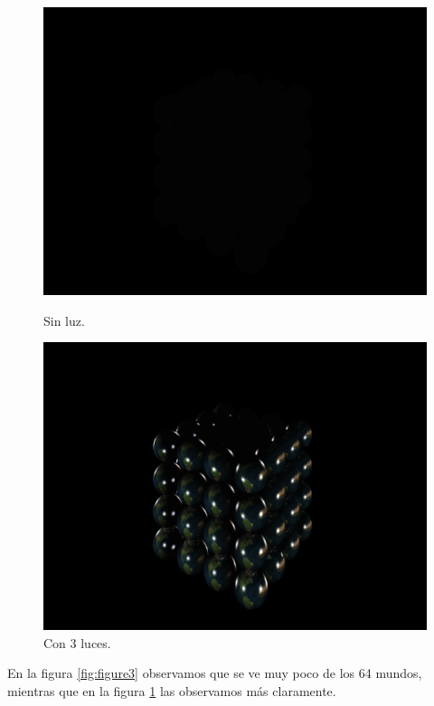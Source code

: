 \documentclass[a4paper,10pt]{article}
\begin{document}
\begin{figure}[ht]
\begin{minipage}[b]{0.5\linewidth}
\centering
\includegraphics[scale=0.25]{scene5a.png}
\caption{Sin luz.}
\label{fig:figure3}
\end{minipage}
\hspace{0.5cm}
\begin{minipage}[b]{0.5\linewidth}
\centering
\includegraphics[scale=0.25]{scene5.png}
\caption{Con 3 luces.}
\label{fig:figure4}
\end{minipage}
\end{figure}

En la figura \ref{fig:figure3} observamos que se ve muy poco de los 64
mundos, mientras que en la figura \ref{fig:figure4} las observamos m\'as
claramente.
\end{document}
